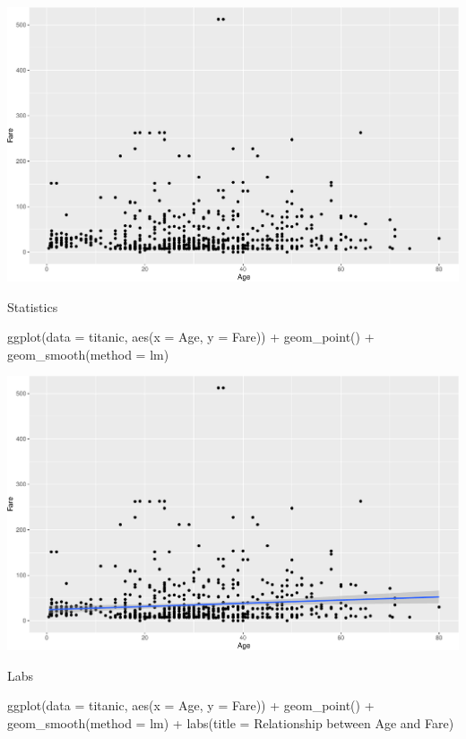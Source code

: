 \documentclass[
]{book}
\newenvironment{Shaded}{\begin{snugshade}}{\end{snugshade}}
\newcommand{\AttributeTok}[1]{\textcolor[rgb]{0.77,0.63,0.00}{#1}}
\newcommand{\FunctionTok}[1]{\textcolor[rgb]{0.00,0.00,0.00}{#1}}
\newcommand{\NormalTok}[1]{#1}
\newcommand{\SpecialCharTok}[1]{\textcolor[rgb]{0.00,0.00,0.00}{#1}}
\newcommand{\StringTok}[1]{\textcolor[rgb]{0.31,0.60,0.02}{#1}}
\begin{document}
\includegraphics{figures/unnamed-chunk-136-1.pdf}

Statistics

\begin{Shaded}
\begin{Highlighting}[]
\FunctionTok{ggplot}\NormalTok{(}\AttributeTok{data =}\NormalTok{ titanic, }\FunctionTok{aes}\NormalTok{(}\AttributeTok{x =}\NormalTok{ Age, }\AttributeTok{y =}\NormalTok{ Fare)) }\SpecialCharTok{+} \FunctionTok{geom\_point}\NormalTok{() }\SpecialCharTok{+} \FunctionTok{geom\_smooth}\NormalTok{(}\AttributeTok{method =} \StringTok{\textquotesingle{}lm\textquotesingle{}}\NormalTok{)}
\end{Highlighting}
\end{Shaded}

\includegraphics{figures/unnamed-chunk-137-1.pdf}

Labs

\begin{Shaded}
\begin{Highlighting}[]
\FunctionTok{ggplot}\NormalTok{(}\AttributeTok{data =}\NormalTok{ titanic, }\FunctionTok{aes}\NormalTok{(}\AttributeTok{x =}\NormalTok{ Age, }\AttributeTok{y =}\NormalTok{ Fare)) }\SpecialCharTok{+} \FunctionTok{geom\_point}\NormalTok{() }\SpecialCharTok{+} \FunctionTok{geom\_smooth}\NormalTok{(}\AttributeTok{method =} \StringTok{\textquotesingle{}lm\textquotesingle{}}\NormalTok{) }\SpecialCharTok{+} \FunctionTok{labs}\NormalTok{(}\AttributeTok{title =} \StringTok{\textquotesingle{}Relationship between Age and Fare\textquotesingle{}}\NormalTok{)}
\end{Highlighting}
\end{Shaded}
\end{document}
